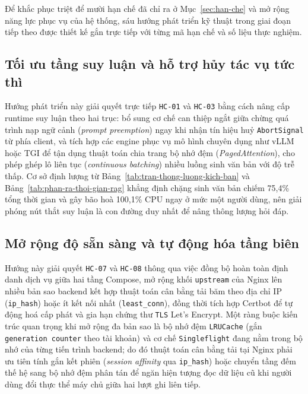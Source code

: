 Để khắc phục triệt để mười hạn chế đã chỉ ra ở Mục~\ref{sec:han-che} và mở rộng năng lực phục vụ của hệ thống, sáu hướng phát triển kỹ thuật trong giai đoạn tiếp theo được thiết kế gắn trực tiếp với từng mã hạn chế và số liệu thực nghiệm.

\subsection{Tối ưu tầng suy luận và hỗ trợ hủy tác vụ tức thì}
\label{subsec:toi-uu-tang-suy-luan}

Hướng phát triển này giải quyết trực tiếp \texttt{HC-01} và \texttt{HC-03} bằng cách nâng cấp runtime suy luận theo hai trục: bổ sung cơ chế can thiệp ngắt giữa chừng quá trình nạp ngữ cảnh (\textit{prompt preemption}) ngay khi nhận tín hiệu huỷ \texttt{AbortSignal} từ phía client, và tích hợp các engine phục vụ mô hình chuyên dụng như vLLM hoặc TGI để tận dụng thuật toán chia trang bộ nhớ đệm (\textit{PagedAttention}), cho phép ghép lô liên tục (\textit{continuous batching}) nhiều luồng sinh văn bản với độ trễ thấp. Cơ sở định lượng từ Bảng~\ref{tab:tran-thong-luong-kich-ban} và Bảng~\ref{tab:phan-ra-thoi-gian-rag} khẳng định chặng sinh văn bản chiếm 75,4\% tổng thời gian và gây bão hoà 100,1\% CPU ngay ở mức một người dùng, nên giải phóng nút thắt suy luận là con đường duy nhất để nâng thông lượng hỏi đáp.

\subsection{Mở rộng độ sẵn sàng và tự động hóa tầng biên}
\label{subsec:mo-rong-tang-bien}

Hướng này giải quyết \texttt{HC-07} và \texttt{HC-08} thông qua việc đồng bộ hoàn toàn định danh dịch vụ giữa hai tầng Compose, mở rộng khối \texttt{upstream} của Nginx lên nhiều bản sao backend kết hợp thuật toán cân bằng tải băm theo địa chỉ IP (\texttt{ip\_hash}) hoặc ít kết nối nhất (\texttt{least\_conn}), đồng thời tích hợp Certbot để tự động hoá cấp phát và gia hạn chứng thư \texttt{TLS} Let's Encrypt. Một ràng buộc kiến trúc quan trọng khi mở rộng đa bản sao là bộ nhớ đệm \texttt{LRUCache} (gắn \texttt{generation counter} theo tài khoản) và cơ chế \texttt{Singleflight} đang nằm trong bộ nhớ của từng tiến trình backend; do đó thuật toán cân bằng tải tại Nginx phải ưu tiên tính gắn kết phiên (\textit{session affinity} qua \texttt{ip\_hash}) hoặc chuyển tầng đếm thế hệ sang bộ nhớ đệm phân tán để ngăn hiện tượng đọc dữ liệu cũ khi người dùng đổi thực thể máy chủ giữa hai lượt ghi liên tiếp.

